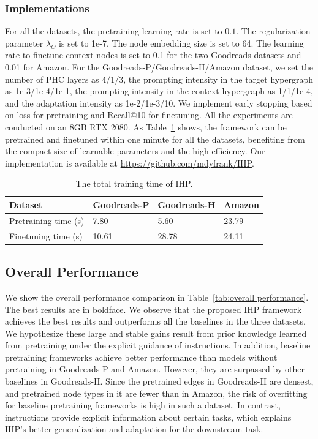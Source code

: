 \subsubsection{Implementations}
For all the datasets, the pretraining learning rate is set to $0.1$. The regularization parameter $\lambda_\Theta$ is set to 1e-7. 
The node embedding size is set to 64.
The learning rate to finetune context nodes is set to 0.1 for the two Goodreads datasets and 0.01 for Amazon.
For the Goodreads-P/Goodreads-H/Amazon dataset, we set the number of PHC layers as 4/1/3, the prompting intensity in the target hypergraph as 1e-3/1e-4/1e-1, the prompting intensity in the context hypergraph as 1/1/1e-4, and the adaptation intensity as 1e-2/1e-3/10. We implement early stopping based on loss for pretraining and Recall@10 for finetuning. All the experiments are conducted on an 8GB RTX 2080. 
As Table~\ref{tab:time} shows, the framework can be pretrained and finetuned within one minute for all the datasets, benefiting from the compact size of learnable parameters and the high efficiency.
Our implementation is available at \url{https://github.com/mdyfrank/IHP}.

\begin{table}\caption{The total training time of IHP.}\label{tab:time}
\begin{tabular}{l|l|l|l}
\hline
Dataset             & Goodreads-P & Goodreads-H & Amazon  \\ \hline
Pretraining time (s) & 7.80     & 5.60   & 23.79 \\
Finetuning time (s)  & 10.61    & 28.78  & 24.11  \\ \hline
\end{tabular}
\end{table}


\subsection{Overall Performance}
We show the overall performance comparison in Table~\ref{tab:overall performance}. 
The best results are in boldface. We observe that the proposed IHP framework achieves the best results and outperforms all the baselines in the three datasets. 
We hypothesize these large and stable gains result from prior knowledge learned from pretraining under the explicit guidance of instructions. 
In addition, baseline pretraining frameworks achieve better performance than models without pretraining in Goodreads-P and Amazon. 
However, they are surpassed by other baselines in Goodreads-H. 
Since the pretrained edges in Goodreads-H are densest, and pretrained node types in it are fewer than in Amazon, the risk of overfitting for baseline pretraining frameworks is high in such a dataset. 
In contrast, instructions provide explicit information about certain tasks, which explains IHP's better generalization and adaptation for the downstream task.

